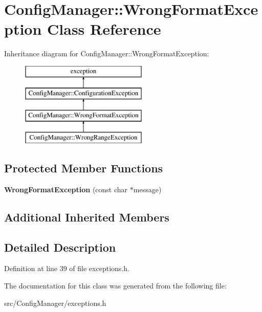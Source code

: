 \hypertarget{class_config_manager_1_1_wrong_format_exception}{}\section{Config\+Manager\+:\+:Wrong\+Format\+Exception Class Reference}
\label{class_config_manager_1_1_wrong_format_exception}
Inheritance diagram for Config\+Manager\+:\+:Wrong\+Format\+Exception\+:\begin{figure}[H]
\begin{center}
\leavevmode
\includegraphics[height=4.000000cm]{class_config_manager_1_1_wrong_format_exception}
\end{center}
\end{figure}
\subsection*{Protected Member Functions}
\begin{DoxyCompactItemize}
\item 
{\bfseries Wrong\+Format\+Exception} (const char $\ast$message)\hypertarget{class_config_manager_1_1_wrong_format_exception_aa38389d999dd1c463fb887a36980b7ce}{}\label{class_config_manager_1_1_wrong_format_exception_aa38389d999dd1c463fb887a36980b7ce}

\end{DoxyCompactItemize}
\subsection*{Additional Inherited Members}


\subsection{Detailed Description}


Definition at line 39 of file exceptions.\+h.



The documentation for this class was generated from the following file\+:\begin{DoxyCompactItemize}
\item 
src/\+Config\+Manager/exceptions.\+h\end{DoxyCompactItemize}
